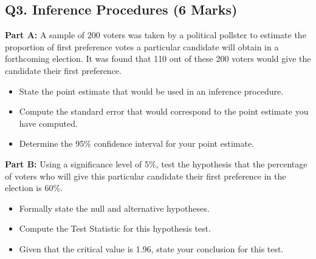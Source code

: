 \subsection*{Q3. Inference Procedures (6 Marks)}


\textbf{Part A:} A sample of 200 voters was taken by a political pollster to estimate the proportion of first preference votes a 
particular candidate will obtain in a forthcoming election. 
It was found that 110 out of these 200 voters would give the candidate their first preference.


\begin{itemize}

\item  State the point estimate that would be used in an inference procedure.

\item  Compute the standard error that would correspond to the point estimate you have computed.

\item  Determine the 95\% confidence interval for your point estimate.
\end{itemize}

\noindent \textbf{Part B:} Using a significance level of 5\%, test the hypothesis that the percentage of voters who will give this 
particular candidate their first preference in the election is 60\%.{\tiny } 

\begin{itemize}

\item  Formally state the null and alternative hypotheses.

\item  Compute the Test Statistic for this hypothesis test.

\item  Given that the critical value is 1.96, state your conclusion for this test.
\end{itemize}


